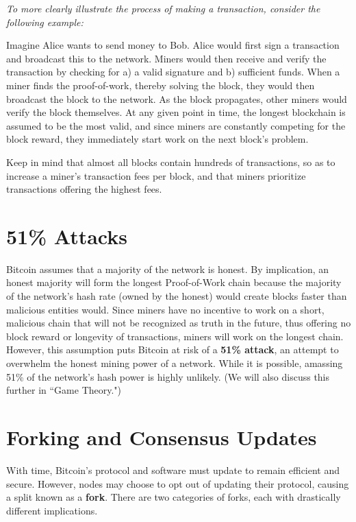 \documentclass[11pt]{article}
\begin{document}
   \textit{To more clearly illustrate the process of making a transaction, consider the following example:}
   
   Imagine Alice wants to send money to Bob. Alice would first sign a transaction and broadcast this to the network. Miners would then receive and verify the transaction by checking for a) a valid signature and b) sufficient funds. When a miner finds the proof-of-work, thereby solving the block, they would then broadcast the block to the network. As the block propagates, other miners would verify the block themselves. At any given point in time, the longest blockchain is assumed to be the most valid, and since miners are constantly competing for the block reward, they immediately start work on the next block's problem.
   
   Keep in mind that almost all blocks contain hundreds of transactions, so as to increase a miner's transaction fees per block, and that miners prioritize transactions offering the highest fees.
   
   \section*{51\% Attacks}
   
   Bitcoin assumes that a majority of the network is honest. By implication, an honest majority will form the longest Proof-of-Work chain because the majority of the network's hash rate (owned by the honest) would create blocks faster than malicious entities would. Since miners have no incentive to work on a short, malicious chain that will not be recognized as truth in the future, thus offering no block reward or longevity of transactions, miners will work on the longest chain. However, this assumption puts Bitcoin at risk of a \textbf{51\% attack}, an attempt to overwhelm the honest mining power of a network. While it is possible, amassing 51\% of the network's hash power is highly unlikely. (We will also discuss this further in ``Game Theory.")
   
   \section*{Forking and Consensus Updates}
   
   With time, Bitcoin's protocol and software must update to remain efficient and secure. However, nodes may choose to opt out of updating their protocol, causing a split known as a \textbf{fork}. There are two categories of forks, each with drastically different implications.
   
\end{document}
